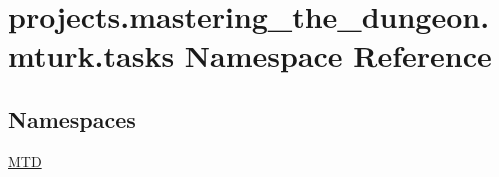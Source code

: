\hypertarget{namespaceprojects_1_1mastering__the__dungeon_1_1mturk_1_1tasks}{}\section{projects.\+mastering\+\_\+the\+\_\+dungeon.\+mturk.\+tasks Namespace Reference}
\label{namespaceprojects_1_1mastering__the__dungeon_1_1mturk_1_1tasks}
\subsection*{Namespaces}
\begin{DoxyCompactItemize}
\item 
 \hyperlink{namespaceprojects_1_1mastering__the__dungeon_1_1mturk_1_1tasks_1_1MTD}{M\+TD}
\end{DoxyCompactItemize}
